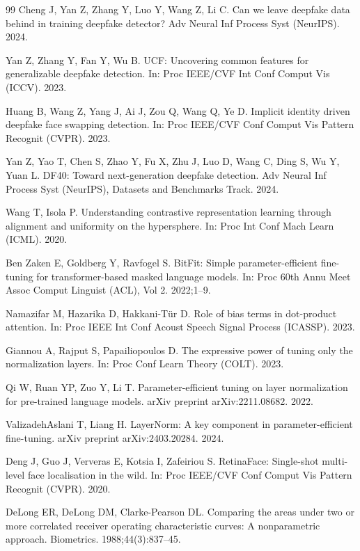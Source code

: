 \documentclass[fonts]{icst}
\begin{document}
\begin{thebibliography}{99}
Cheng J, Yan Z, Zhang Y, Luo Y, Wang Z, Li C.
Can we leave deepfake data behind in training deepfake detector?
Adv Neural Inf Process Syst (NeurIPS). 2024.

Yan Z, Zhang Y, Fan Y, Wu B.
UCF: Uncovering common features for generalizable deepfake detection.
In: Proc IEEE/CVF Int Conf Comput Vis (ICCV). 2023.

Huang B, Wang Z, Yang J, Ai J, Zou Q, Wang Q, Ye D.
Implicit identity driven deepfake face swapping detection.
In: Proc IEEE/CVF Conf Comput Vis Pattern Recognit (CVPR). 2023.

Yan Z, Yao T, Chen S, Zhao Y, Fu X, Zhu J, Luo D, Wang C, Ding S, Wu Y, Yuan L.
DF40: Toward next-generation deepfake detection.
Adv Neural Inf Process Syst (NeurIPS), Datasets and Benchmarks Track. 2024.

Wang T, Isola P.
Understanding contrastive representation learning through alignment and uniformity on the hypersphere.
In: Proc Int Conf Mach Learn (ICML). 2020.

Ben Zaken E, Goldberg Y, Ravfogel S.
BitFit: Simple parameter-efficient fine-tuning for transformer-based masked language models.
In: Proc 60th Annu Meet Assoc Comput Linguist (ACL), Vol 2. 2022;1--9.

Namazifar M, Hazarika D, Hakkani-T{\"u}r D.
Role of bias terms in dot-product attention.
In: Proc IEEE Int Conf Acoust Speech Signal Process (ICASSP). 2023.

Giannou A, Rajput S, Papailiopoulos D.
The expressive power of tuning only the normalization layers.
In: Proc Conf Learn Theory (COLT). 2023.

Qi W, Ruan YP, Zuo Y, Li T.
Parameter-efficient tuning on layer normalization for pre-trained language models.
arXiv preprint arXiv:2211.08682. 2022.

ValizadehAslani T, Liang H.
LayerNorm: A key component in parameter-efficient fine-tuning.
arXiv preprint arXiv:2403.20284. 2024.

Deng J, Guo J, Ververas E, Kotsia I, Zafeiriou S.
RetinaFace: Single-shot multi-level face localisation in the wild.
In: Proc IEEE/CVF Conf Comput Vis Pattern Recognit (CVPR). 2020.

DeLong ER, DeLong DM, Clarke-Pearson DL.
Comparing the areas under two or more correlated receiver operating characteristic curves: A nonparametric approach.
Biometrics. 1988;44(3):837--45.


\end{thebibliography}
\end{document}
